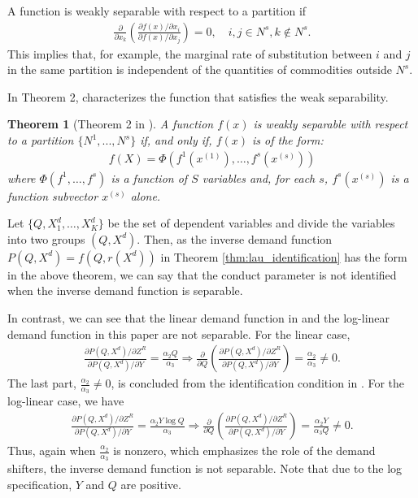 \documentclass[11pt, a4paper]{article}
\newtheorem{theorem}{Theorem}
\theoremstyle{remark}
\begin{document}
A function is weakly separable with respect to a partition if 
\begin{align}
    \frac{\partial}{\partial x_k}\left(\frac{\partial f(x)/\partial x_i}{\partial f(x)/\partial x_j} \right)= 0, \quad i,j\in N^s, k \notin N^s.
\end{align}
This implies that, for example, the marginal rate of substitution between $i$ and $j$ in the same partition is independent of the quantities of commodities outside $N^s$.

In Theorem 2, \citet{goldmanNote1964} characterizes the function that satisfies the weak separability.
\begin{theorem}[Theorem 2 in \citet{goldmanNote1964}]
    A function $f(x)$ is weakly separable with respect to a partition $\{N^1, .. ., N^s\}$ if, and only if, $f(x)$ is of the form: 
    \begin{align}
        f(X) = \Phi(f^1(x^{(1)}),\ldots, f^s(x^{(s)})   )
    \end{align} where $\Phi(f^1,\ldots, f^s)$ is a function of $S$ variables and, for each $s$, $f^s(x^{(s)})$ is a function subvector $x^{(s)}$ alone.
\end{theorem}

Let $\{Q, X_{1}^{d},\ldots, X_{K}^{d}\}$ be the set of dependent variables and divide the variables into two groups $(Q, X^{d})$.
Then, as the inverse demand function $P(Q, X^{d}) = f(Q, r(X^{d}))$ in Theorem \ref{thm:lau_identification} has the form in the above theorem, we can say that the conduct parameter is not identified when the inverse demand function is separable.

In contrast, we can see that the linear demand function in \citet{bresnahan1982oligopoly} and the log-linear demand function in this paper are not separable.
For the linear case,
\begin{align}
    \frac{\partial P(Q, X^{d})/\partial Z^{R}}{\partial P(Q, X^{d})/\partial Y} = \frac{ \alpha_2 Q}{\alpha_3} \Longrightarrow \frac{\partial}{\partial Q}\left(\frac{\partial P(Q, X^{d})/\partial Z^{R}}{\partial P(Q, X^{d})/\partial Y}\right) = \frac{\alpha_2}{\alpha_3} \ne 0.
\end{align}
The last part, $\frac{\alpha_2}{\alpha_3} \ne 0$, is concluded from the identification condition in \citet{matsumura2023resolving}.
For the log-linear case, we have
\begin{align}
    \frac{\partial P(Q, X^{d})/\partial Z^{R}}{\partial P(Q, X^{d})/\partial Y}  = \frac{\alpha_2 Y \log Q}{\alpha_3} \Longrightarrow \frac{\partial}{\partial Q}\left(\frac{\partial P(Q, X^{d})/\partial Z^{R}}{\partial P(Q, X^{d})/\partial Y}\right) = \frac{\alpha_2Y}{\alpha_3Q} \ne 0.
\end{align}
Thus, again when $\frac{\alpha_2}{\alpha_3}$ is nonzero, which emphasizes the role of the demand shifters,  the inverse demand function is not separable.
Note that due to the log specification, $Y$ and $Q$ are positive.
\end{document}
